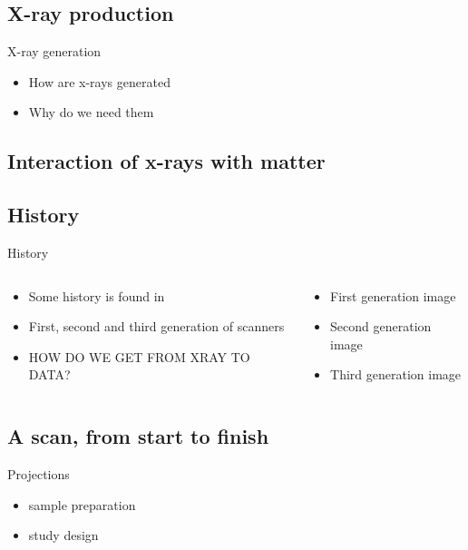 \documentclass[aspectratio=169,10pt,draft]{beamer}
\begin{document}
\subsection{X-ray production}
\begin{frame}{X-ray generation}
	\begin{itemize}
		\item How are x-rays generated
		\item  Why do we need them
	\end{itemize}
\end{frame}


\subsection{Interaction of x-rays with matter}

\subsection{History}
\begin{frame}{History}
	\begin{columns}
		\begin{column}{0.5\linewidth}
			\begin{itemize}
				\item<1-> Some history is found in \cite{Cormack1963a}
				\item<2-> First, second and third generation of scanners
				\item<5> HOW DO WE GET FROM XRAY TO DATA?
			\end{itemize}
		\end{column}
		\begin{column}{0.5\linewidth}
			\begin{itemize}
				\item<2> First generation image
				\item<3> Second generation image
				\item<4> Third generation image
			\end{itemize}
		\end{column}
	\end{columns}		
\end{frame}

\subsection{A scan, from start to finish}
\begin{frame}[allowframebreaks]{Projections}
	\begin{itemize}
		\item sample preparation
		\item study design
	\end{itemize}
\end{frame}
\end{document}
